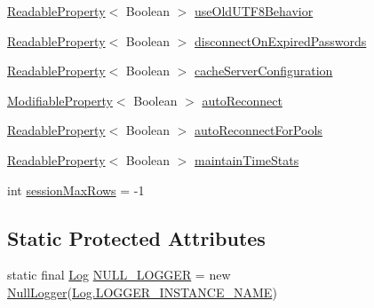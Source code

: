 \begin{DoxyCompactItemize}
\item 
\mbox{\hyperlink{interfacecom_1_1mysql_1_1cj_1_1conf_1_1_readable_property}{Readable\+Property}}$<$ Boolean $>$ \mbox{\hyperlink{classcom_1_1mysql_1_1cj_1_1_core_session_ad95983b250a85e6fa0bd358a96a94aa8}{use\+Old\+U\+T\+F8\+Behavior}}
\item 
\mbox{\hyperlink{interfacecom_1_1mysql_1_1cj_1_1conf_1_1_readable_property}{Readable\+Property}}$<$ Boolean $>$ \mbox{\hyperlink{classcom_1_1mysql_1_1cj_1_1_core_session_a92fb2049f7ab1f3c1cc931e972c79852}{disconnect\+On\+Expired\+Passwords}}
\item 
\mbox{\hyperlink{interfacecom_1_1mysql_1_1cj_1_1conf_1_1_readable_property}{Readable\+Property}}$<$ Boolean $>$ \mbox{\hyperlink{classcom_1_1mysql_1_1cj_1_1_core_session_ad38cfd927b1a30ec9eae15278c861fda}{cache\+Server\+Configuration}}
\item 
\mbox{\hyperlink{interfacecom_1_1mysql_1_1cj_1_1conf_1_1_modifiable_property}{Modifiable\+Property}}$<$ Boolean $>$ \mbox{\hyperlink{classcom_1_1mysql_1_1cj_1_1_core_session_a560aaa84ad31aff44b20e35eebc1a0df}{auto\+Reconnect}}
\item 
\mbox{\hyperlink{interfacecom_1_1mysql_1_1cj_1_1conf_1_1_readable_property}{Readable\+Property}}$<$ Boolean $>$ \mbox{\hyperlink{classcom_1_1mysql_1_1cj_1_1_core_session_a11b8896105ef5ba529bfd8794548ea23}{auto\+Reconnect\+For\+Pools}}
\item 
\mbox{\hyperlink{interfacecom_1_1mysql_1_1cj_1_1conf_1_1_readable_property}{Readable\+Property}}$<$ Boolean $>$ \mbox{\hyperlink{classcom_1_1mysql_1_1cj_1_1_core_session_a3c26bae0303430033c3bd5dcd7fe130b}{maintain\+Time\+Stats}}
\item 
int \mbox{\hyperlink{classcom_1_1mysql_1_1cj_1_1_core_session_a6206b6d3a13ba61a394fd6ab6e93eafc}{session\+Max\+Rows}} = -\/1
\end{DoxyCompactItemize}
\subsection*{Static Protected Attributes}
\begin{DoxyCompactItemize}
\item 
static final \mbox{\hyperlink{interfacecom_1_1mysql_1_1cj_1_1log_1_1_log}{Log}} \mbox{\hyperlink{classcom_1_1mysql_1_1cj_1_1_core_session_abab1c389edfdd2699a26784b836d1faa}{N\+U\+L\+L\+\_\+\+L\+O\+G\+G\+ER}} = new \mbox{\hyperlink{classcom_1_1mysql_1_1cj_1_1log_1_1_null_logger}{Null\+Logger}}(\mbox{\hyperlink{interfacecom_1_1mysql_1_1cj_1_1log_1_1_log_aa34677968e5974954c41aaa7f5c6ddec}{Log.\+L\+O\+G\+G\+E\+R\+\_\+\+I\+N\+S\+T\+A\+N\+C\+E\+\_\+\+N\+A\+ME}})
\end{DoxyCompactItemize}


